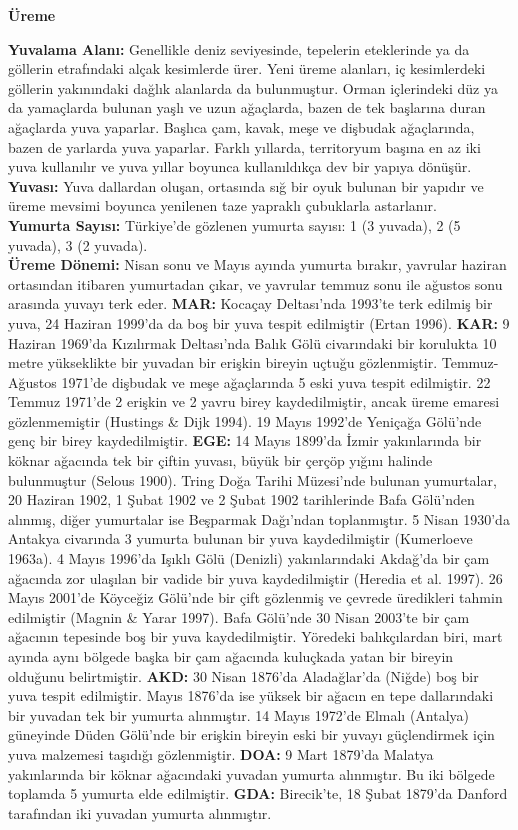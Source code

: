 \documentclass[
  letterpaper,
  DIV=11,
  numbers=noendperiod]{scrreprt}
\begin{document}
\textbf{Üreme}

\textbf{Yuvalama Alanı:} Genellikle deniz seviyesinde, tepelerin
eteklerinde ya da göllerin etrafındaki alçak kesimlerde ürer. Yeni üreme
alanları, iç kesimlerdeki göllerin yakınındaki dağlık alanlarda da
bulunmuştur. Orman içlerindeki düz ya da yamaçlarda bulunan yaşlı ve
uzun ağaçlarda, bazen de tek başlarına duran ağaçlarda yuva yaparlar.
Başlıca çam, kavak, meşe ve dişbudak ağaçlarında, bazen de yarlarda yuva
yaparlar. Farklı yıllarda, territoryum başına en az iki yuva kullanılır
ve yuva yıllar boyunca kullanıldıkça dev bir yapıya dönüşür.\\
\textbf{Yuvası:} Yuva dallardan oluşan, ortasında sığ bir oyuk bulunan
bir yapıdır ve üreme mevsimi boyunca yenilenen taze yapraklı çubuklarla
astarlanır.\\
\textbf{Yumurta Sayısı:} Türkiye'de gözlenen yumurta sayısı: 1 (3
yuvada), 2 (5 yuvada), 3 (2 yuvada).\\
\textbf{Üreme Dönemi:} Nisan sonu ve Mayıs ayında yumurta bırakır,
yavrular haziran ortasından itibaren yumurtadan çıkar, ve yavrular
temmuz sonu ile ağustos sonu arasında yuvayı terk eder. \textbf{MAR:}
Kocaçay Deltası'nda 1993'te terk edilmiş bir yuva, 24 Haziran 1999'da da
boş bir yuva tespit edilmiştir (Ertan 1996). \textbf{KAR:} 9 Haziran
1969'da Kızılırmak Deltası'nda Balık Gölü civarındaki bir korulukta 10
metre yükseklikte bir yuvadan bir erişkin bireyin uçtuğu gözlenmiştir.
Temmuz-Ağustos 1971'de dişbudak ve meşe ağaçlarında 5 eski yuva tespit
edilmiştir. 22 Temmuz 1971'de 2 erişkin ve 2 yavru birey kaydedilmiştir,
ancak üreme emaresi gözlenmemiştir (Hustings \& Dijk 1994). 19 Mayıs
1992'de Yeniçağa Gölü'nde genç bir birey kaydedilmiştir. \textbf{EGE:}
14 Mayıs 1899'da İzmir yakınlarında bir köknar ağacında tek bir çiftin
yuvası, büyük bir çerçöp yığını halinde bulunmuştur (Selous 1900). Tring
Doğa Tarihi Müzesi'nde bulunan yumurtalar, 20 Haziran 1902, 1 Şubat 1902
ve 2 Şubat 1902 tarihlerinde Bafa Gölü'nden alınmış, diğer yumurtalar
ise Beşparmak Dağı'ndan toplanmıştır. 5 Nisan 1930'da Antakya civarında
3 yumurta bulunan bir yuva kaydedilmiştir (Kumerloeve 1963a). 4 Mayıs
1996'da Işıklı Gölü (Denizli) yakınlarındaki Akdağ'da bir çam ağacında
zor ulaşılan bir vadide bir yuva kaydedilmiştir (Heredia et al. 1997).
26 Mayıs 2001'de Köyceğiz Gölü'nde bir çift gözlenmiş ve çevrede
üredikleri tahmin edilmiştir (Magnin \& Yarar 1997). Bafa Gölü'nde 30
Nisan 2003'te bir çam ağacının tepesinde boş bir yuva kaydedilmiştir.
Yöredeki balıkçılardan biri, mart ayında aynı bölgede başka bir çam
ağacında kuluçkada yatan bir bireyin olduğunu belirtmiştir.
\textbf{AKD:} 30 Nisan 1876'da Aladağlar'da (Niğde) boş bir yuva tespit
edilmiştir. Mayıs 1876'da ise yüksek bir ağacın en tepe dallarındaki bir
yuvadan tek bir yumurta alınmıştır. 14 Mayıs 1972'de Elmalı (Antalya)
güneyinde Düden Gölü'nde bir erişkin bireyin eski bir yuvayı
güçlendirmek için yuva malzemesi taşıdığı gözlenmiştir. \textbf{DOA:} 9
Mart 1879'da Malatya yakınlarında bir köknar ağacındaki yuvadan yumurta
alınmıştır. Bu iki bölgede toplamda 5 yumurta elde edilmiştir.
\textbf{GDA:} Birecik'te, 18 Şubat 1879'da Danford tarafından iki
yuvadan yumurta alınmıştır.
\end{document}
